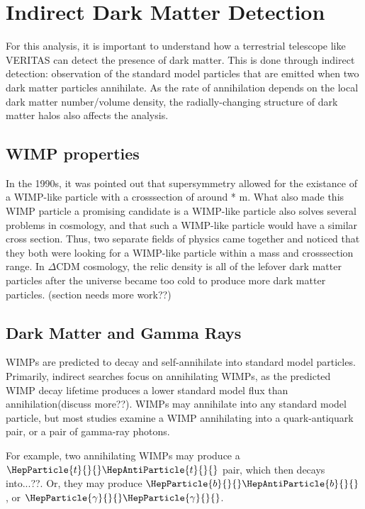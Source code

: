 \section{Indirect Dark Matter Detection}

For this analysis, it is important to understand how a terrestrial telescope like VERITAS can detect the presence of dark matter.
This is done through indirect detection: observation of the standard model particles that are emitted when two dark matter particles annihilate.
As the rate of annihilation depends on the local dark matter number/volume density, the radially-changing structure of dark matter halos also affects the analysis.

\subsection{WIMP properties}


In the 1990s, it was pointed out that supersymmetry allowed for the existance of a WIMP-like particle with a crosssection of around  *  m.
What also made this WIMP particle a promising candidate is a WIMP-like particle also solves several problems in cosmology, and that such a WIMP-like particle would have a similar cross section.
Thus, two separate fields of physics came together and noticed that they both were looking for a WIMP-like particle within a mass and crosssection range.
In $\Delta$CDM cosmology, the relic density is all of the lefover dark matter particles after the universe became too cold to produce more dark matter particles.
(section needs more work??)

\subsection{Dark Matter and Gamma Rays}

WIMPs are predicted to decay and self-annihilate into standard model particles.
Primarily, indirect searches focus on annihilating WIMPs, as the predicted WIMP decay lifetime produces a lower standard model flux than annihilation(discuss more??).
WIMPs may annihilate into any standard model particle, but most studies examine a WIMP annihilating into a quark-antiquark pair, or a pair of gamma-ray photons.

For example, two annihilating WIMPs may produce a $\HepParticle{t}{}{}\HepAntiParticle{t}{}{}$ pair, which then decays into...??.
Or, they may produce $\HepParticle{b}{}{}\HepAntiParticle{b}{}{}$, or $\HepParticle{\gamma}{}{}\HepParticle{\gamma}{}{}$.

